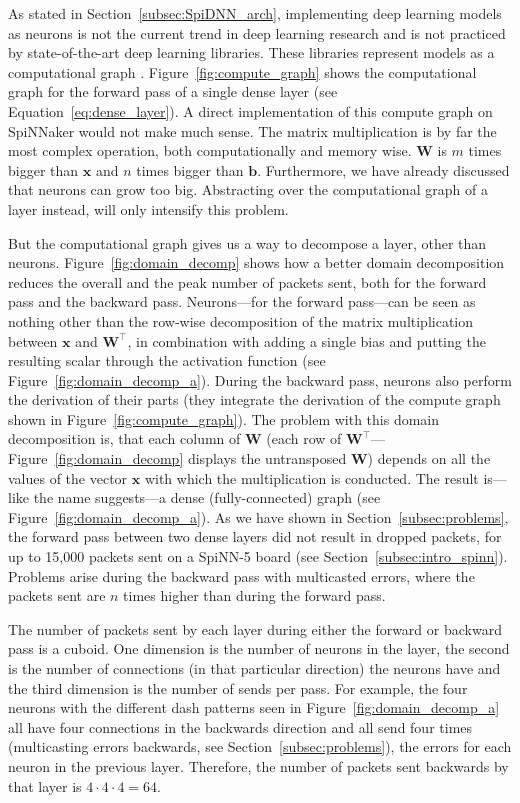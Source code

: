\documentclass[]{article}
\begin{document}
As stated in Section~\ref{subsec:SpiDNN_arch}, implementing deep
learning models as neurons is not the current trend in deep learning
research and is not practiced by state-of-the-art deep learning
libraries.
These libraries represent models as a computational graph
\citep{goodfellow_et_al_2016, abadi_et_al_2015}.
Figure~\ref{fig:compute_graph} shows the computational graph for
the forward pass of a single dense layer (see
Equation~\ref{eq:dense_layer}).
A direct implementation of this compute graph on SpiNNaker would not
make much sense.
The matrix multiplication is by far the most complex operation, both
computationally and memory wise.
$\mathbf{W}$ is $m$ times bigger than $\mathbf{x}$ and $n$ times
bigger than $\mathbf{b}$.
Furthermore, we have already discussed that neurons can grow too big.
Abstracting over the computational graph of a layer instead, will only
intensify this problem.

But the computational graph gives us a way to decompose a layer,
other than neurons.
Figure~\ref{fig:domain_decomp} shows how a better domain decomposition
reduces the overall and the peak number of packets sent, both for
the forward pass and the backward pass.
Neurons---for the forward pass---can be seen as nothing other than the
row-wise decomposition of the matrix multiplication between
$\mathbf{x}$ and $\mathbf{W}^\top$, in combination with adding a
single bias and putting the resulting scalar through the activation
function (see Figure~\ref{fig:domain_decomp_a}).
During the backward pass, neurons also perform the derivation of their
parts (they integrate the derivation of the compute graph shown in
Figure~\ref{fig:compute_graph}).
The problem with this domain decomposition is, that each column of
$\mathbf{W}$ (each row of
$\mathbf{W}^\top$---Figure~\ref{fig:domain_decomp} displays the
untransposed $\mathbf{W}$) depends on all the values
of the vector $\mathbf{x}$ with which the multiplication is conducted.
The result is---like the name suggests---a dense (fully-connected)
graph (see Figure~\ref{fig:domain_decomp_a}).
As we have shown in Section~\ref{subsec:problems}, the forward pass
between two dense layers did not result in dropped packets, for up
to 15,000 packets sent on a SpiNN-5 board (see
Section~\ref{subsec:intro_spinn}).
Problems arise during the backward pass with multicasted errors, where
the packets sent are $n$ times higher than during the forward pass.

The number of packets sent by each layer during either the forward
or backward pass is a cuboid.
One dimension is the number of neurons in the layer, the second is
the number of connections (in that particular direction) the neurons
have and the third dimension is the number of sends per pass.
For example, the four neurons with the different dash patterns seen in
Figure~\ref{fig:domain_decomp_a} all have four connections in the
backwards direction and all send four times (multicasting errors
backwards, see Section~\ref{subsec:problems}), the errors for each
neuron in the previous layer.
Therefore, the number of packets sent backwards by that layer is
$4 \cdot 4 \cdot 4 = 64$.
\end{document}
